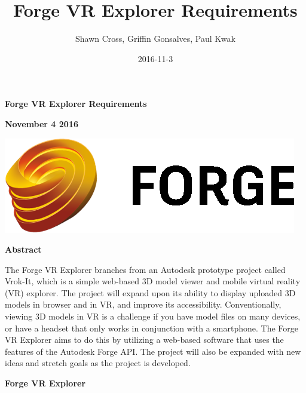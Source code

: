 \documentclass[letterpaper, 10pt, draftclsnofoot, compsoc, onecolumn]{IEEEtran}
\title{Forge VR Explorer Requirements}
\author{Shawn Cross, Griffin Gonsalves, Paul Kwak}
\date{2016-11-3}
\begin{document}
\clearpage\setcounter{page}{1}\pagestyle{Standard}
\thispagestyle{FirstPage}

\bigskip

{\centering{}\bfseries\color{black}
Forge VR Explorer Requirements
\par}


\bigskip

{\centering{}\bfseries\color{black}
November 4 2016
\par}
\bigskip
\bigskip
\bigskip
\bigskip
\bigskip
\bigskip
\bigskip
\bigskip
\bigskip
\bigskip
\bigskip
\bigskip
\begin{center}
	\includegraphics[scale=0.8]{forge_logo.png}
\end{center}


\vfill
{\centering{}\bfseries\color{black}
Abstract
\par}

{\centering{}\mdseries\color{black}
	The Forge VR Explorer branches from an Autodesk prototype project called Vrok-It, which is a simple web-based 3D 
	model viewer and mobile virtual reality (VR) explorer. The project will expand upon its ability to display uploaded 3D 
	models in browser and in VR, and improve its accessibility. Conventionally, viewing 3D models in VR is a challenge if 
	you have model files on many devices, or have a headset that only works in conjunction with a smartphone. The 
	Forge VR Explorer aims to do this by utilizing a web-based software that uses the features of the Autodesk Forge API. 
	The project will also be expanded with new ideas and stretch goals as the project is developed.
\par}

\bigskip
\bigskip


\bigskip

{\centering{}\bfseries\color{black}
Forge VR Explorer
\par}
\end{document}
